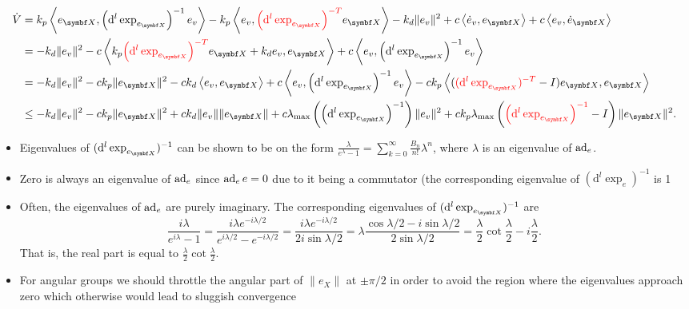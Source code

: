 \begin{equation*}
  \begin{aligned}
    \dot V & = k_p \left \langle e_\X, \left( \mathrm{d}^l \exp_{e_\X} \right)^{-1} e_v \right \rangle - k_p \left \langle e_v,  \textcolor{red}{\left( \mathrm{d}^l \exp_{e_\X} \right)^{-T}} e_\X \right \rangle - k_d \| e_v \|^2 + c \left \langle \dot e_v, e_\X \right \rangle + c \left \langle e_v, \dot e_\X \right \rangle \\
           & = - k_d \| e_v \|^2 - c \left \langle k_p \textcolor{red}{\left( \mathrm{d}^l \exp_{e_\X} \right)^{-T}} e_\X + k_d e_v, e_\X \right \rangle + c \left \langle e_v, \left(\mathrm{d}^l \exp_{e_\X} \right)^{-1} e_v \right \rangle                                                                                       \\
           & = -k_d \| e_v \|^2 - c k_p \| e_\X \|^2 - c k_d \left \langle e_v, e_\X \right \rangle + c \left \langle e_v, \left(\mathrm{d}^l \exp_{e_\X} \right)^{-1} e_v \right \rangle - c k_p \left \langle ( \textcolor{red}{(\mathrm{d}^l \exp_{e_\X})^{-T}} - I) e_\X , e_\X \right \rangle                                   \\
           & \leq -k_d \| e_v \|^2 - c k_p \| e_\X \|^2 + c k_d \| e_v \| \| e_\X \| + c \lambda_{\textrm{max}}\left( \left( \mathrm{d}^l \exp_{e_\X} \right)^{-1} \right) \| e_v \|^2 + c k_p \lambda_{\textrm{max}} \left( \textcolor{red}{\left(\mathrm{d}^l \exp_{e_\X} \right)^{-1}} - I \right) \| e_\X \|^2.
  \end{aligned}
\end{equation*}

\begin{itemize}
  \item Eigenvalues of $(\mathrm{d}^l \exp_{e_\X})^{-1}$ can be shown to be on the form $\frac{\lambda}{e^{\lambda} - 1} = \sum_{k=0}^\infty \frac{B_n}{n!} \lambda^n$, where $\lambda$ is an eigenvalue of $\operatorname{ad}_e$.
  \item Zero is always an eigenvalue of $\operatorname{ad}_e$ since $\operatorname{ad}_e e = 0$ due to it being a commutator (the corresponding eigenvalue of $(\mathrm{d}^l \exp_e)^{-1}$ is 1
  \item Often, the eigenvalues of $\operatorname{ad}_e$ are purely imaginary. The corresponding eigenvalues of $(\mathrm{d}^l \exp_{e_\X})^{-1}$ are
        \begin{equation}
          \frac{i \lambda}{e^{i \lambda} - 1} = \frac{i \lambda e^{-i \lambda / 2}}{e^{i \lambda / 2} - e^{- i \lambda / 2}} = \frac{i \lambda e^{-i \lambda / 2}}{2 i \sin \lambda / 2} = \lambda \frac{\cos \lambda / 2 - i \sin \lambda / 2}{2 \sin \lambda / 2} = \frac{\lambda}{2} \cot \frac{\lambda}{2} - i \frac{\lambda}{2}.
        \end{equation}
        That is, the real part is equal to $\frac{\lambda}{2}\cot \frac{\lambda}{2}$.
  \item For angular groups we should throttle the angular part of $\| e_X \|$ at $\pm \pi/2$ in order to avoid the region where the eigenvalues approach zero which otherwise would lead to sluggish convergence
\end{itemize}

